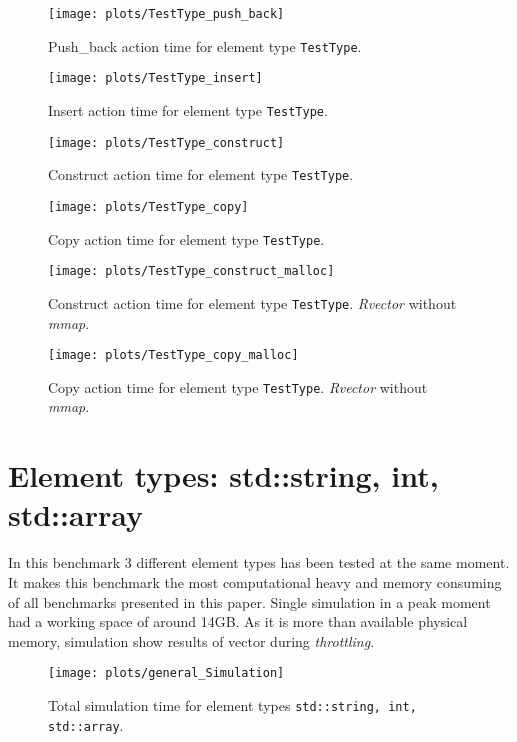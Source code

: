 \documentclass[inz, english, shortabstract]{iithesis}
\begin{document}
\begin{figure}[h!]
\label{TestType_push_back}
\texttt{[image: plots/TestType\_push\_back]}
\caption{Push\_back action time for element type \lstinline{TestType}.}
\end{figure}

\begin{figure}[h!]
\label{TestType_insert}
\texttt{[image: plots/TestType\_insert]}
\caption{Insert action time for element type \lstinline{TestType}.}
\end{figure}

\begin{figure}[h!]
\label{TestType_construct}
\texttt{[image: plots/TestType\_construct]}
\caption{Construct action time for element type \lstinline{TestType}.}
\end{figure}

\begin{figure}[h!]
\label{TestType_copy}
\texttt{[image: plots/TestType\_copy]}
\caption{Copy action time for element type \lstinline{TestType}.}
\end{figure}


\begin{figure}[h!]
\label{TestType_construct_malloc}
\texttt{[image: plots/TestType\_construct\_malloc]}
\caption{Construct action time for element type \lstinline{TestType}. {\it Rvector} without {\it mmap}.}
\end{figure}

\begin{figure}[h!]
\label{TestType_copy_malloc}
\texttt{[image: plots/TestType\_copy\_malloc]}
\caption{Copy action time for element type \lstinline{TestType}. {\it Rvector} without {\it mmap}.}
\end{figure}

\section{Element types: std::string, int, std::array}
In this benchmark 3 different element types has been tested at the same moment. It makes this benchmark the most computational heavy and memory consuming of all benchmarks presented in this paper. Single simulation in a peak moment had a working space of around 14GB. As it is more than available physical memory,  simulation show results of vector during {\it throttling}.

\begin{figure}[h!]
\label{general_simulation}
\texttt{[image: plots/general\_Simulation]}
\caption{Total simulation time for element types \lstinline{std::string, int, std::array}.}
\end{figure}
\end{document}
